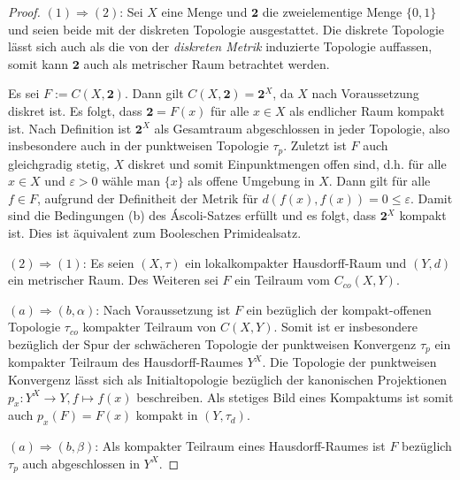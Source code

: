 \begin{proof}
  $(1) \Rightarrow (2)$: Sei $X$ eine Menge und $\mathbf{2}$ die zweielementige Menge $\{0,1\}$ und seien beide mit der diskreten Topologie ausgestattet. 
  Die diskrete Topologie lässt sich auch als die von der \textit{diskreten Metrik} induzierte Topologie auffassen, somit kann $\mathbf{2}$ auch als metrischer Raum betrachtet werden. 

  Es sei $F := C(X, \mathbf{2})$.
  Dann gilt $C(X, \mathbf{2}) = \mathbf{2}^X$, da $X$ nach Voraussetzung diskret ist.
  Es folgt, dass $\mathbf{2} = F(x)$ für alle $x \in X$ als endlicher Raum kompakt ist.
  Nach Definition ist $\mathbf{2}^X$ als Gesamtraum abgeschlossen in jeder Topologie, also insbesondere auch in der punktweisen Topologie $\tau_p$.
  Zuletzt ist $F$ auch gleichgradig stetig, $X$ diskret und somit Einpunktmengen offen sind, d.h. für alle $x \in X$ und $\varepsilon > 0$ wähle man $\{x\}$ als offene Umgebung in $X$. Dann gilt für alle $f \in F$, aufgrund der Definitheit der Metrik für  $d(f(x),f(x)) = 0 \leq \varepsilon$.
  Damit sind die Bedingungen (b) des Áscoli-Satzes erfüllt und es folgt, dass $\mathbf{2}^X$ kompakt ist. Dies ist äquivalent zum Booleschen Primidealsatz.

  $(2) \Rightarrow (1)$: Es seien $(X,\tau)$ ein lokalkompakter Hausdorff-Raum und $(Y,d)$ ein metrischer Raum.
  Des Weiteren sei $F$ ein Teilraum vom $C_{co}(X,Y)$.

  $(a) \Rightarrow (b, \alpha)$: 
  Nach Voraussetzung ist $F$ ein bezüglich der kompakt-offenen Topologie $\tau_{co}$ kompakter Teilraum von $C(X,Y)$.
  Somit ist er insbesondere bezüglich der Spur der schwächeren Topologie der punktweisen Konvergenz $\tau_p$ ein kompakter Teilraum des Hausdorff-Raumes $Y^X$.
  Die Topologie der punktweisen Konvergenz lässt sich als Initialtopologie bezüglich der kanonischen Projektionen $p_x : Y^X \to Y, f \mapsto f(x)$ beschreiben.
  Als stetiges Bild eines Kompaktums ist somit auch $p_x(F) = F(x)$ kompakt in $(Y,\tau_d)$.

  $(a) \Rightarrow (b, \beta)$:  
  Als kompakter Teilraum eines Hausdorff-Raumes ist $F$ bezüglich $\tau_p$ auch abgeschlossen in $Y^X$.


\end{proof}
